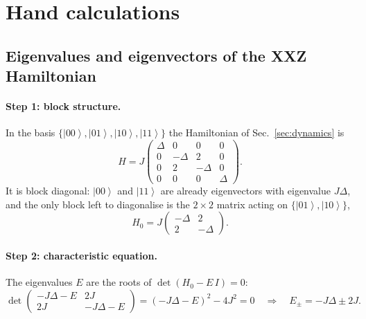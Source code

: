 \documentclass[11pt,a4paper]{article}
\newcommand{\ket}[1]{\left|#1\right\rangle}
\begin{document}
\appendix
\section{Hand calculations}
\subsection{Eigenvalues and eigenvectors of the XXZ Hamiltonian}

\paragraph{Step 1: block structure.}
In the basis $\{\ket{00},\ket{01},\ket{10},\ket{11}\}$ the Hamiltonian of Sec.~\ref{sec:dynamics} is
\begin{equation}
  H=J\begin{pmatrix}
  \Delta&0&0&0\\
  0&-\Delta&2&0\\
  0&2&-\Delta&0\\
  0&0&0&\Delta
  \end{pmatrix}.
\end{equation}
It is block diagonal: $\ket{00}$ and $\ket{11}$ are already eigenvectors with eigenvalue $J\Delta$, and the only block left to diagonalise is the $2\times2$ matrix acting on $\{\ket{01},\ket{10}\}$,
\begin{equation}
  H_0=J\begin{pmatrix}-\Delta&2\\2&-\Delta\end{pmatrix}.
\end{equation}

\paragraph{Step 2: characteristic equation.}
The eigenvalues $E$ are the roots of $\det(H_0-E\,I)=0$:
\begin{equation}
  \det\begin{pmatrix}-J\Delta-E&2J\\2J&-J\Delta-E\end{pmatrix}
  =(-J\Delta-E)^2-4J^2=0
  \quad\Longrightarrow\quad
  E_\pm=-J\Delta\pm2J .
\end{equation}
\end{document}
